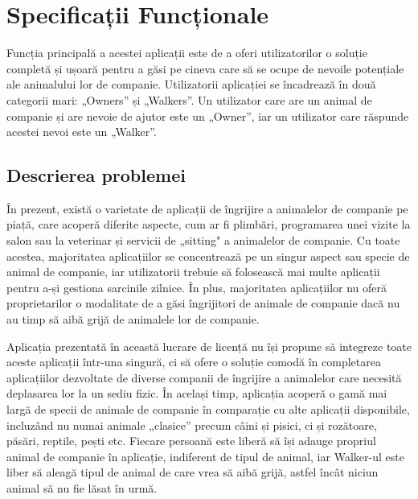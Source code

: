 \chapter{Specificații Funcționale}

Funcția principală a acestei aplicații este de a oferi utilizatorilor o soluție completă și ușoară pentru a găsi pe cineva care să se ocupe de nevoile potențiale ale animalului lor de companie. Utilizatorii aplicației se încadrează în două categorii mari: „Owners” și „Walkers”. Un utilizator care are un animal de companie și are nevoie de ajutor este un „Owner”, iar un utilizator care răspunde acestei nevoi este un „Walker”.

\section{Descrierea problemei}

În prezent, există o varietate de aplicații de îngrijire a animalelor de companie pe piață, care acoperă diferite aspecte, cum ar fi plimbări, programarea unei vizite la salon sau la veterinar și servicii de „sitting" a animalelor de companie. Cu toate acestea, majoritatea aplicațiilor se concentrează pe un singur aspect sau specie de animal de companie, iar utilizatorii trebuie să folosească mai multe aplicații pentru a-și gestiona sarcinile zilnice. În plus, majoritatea aplicațiilor nu oferă proprietarilor o modalitate de a găsi îngrijitori de animale de companie dacă nu au timp să aibă grijă de animalele lor de companie.

Aplicația prezentată în această lucrare de licență nu își propune să integreze toate aceste aplicații într-una singură, ci să ofere o soluție comodă în completarea aplicațiilor dezvoltate de diverse companii de îngrijire a animalelor care necesită deplasarea lor la un sediu fizic. În același timp, aplicația acoperă o gamă mai largă de specii de animale de companie în comparație cu alte aplicații disponibile, incluzând nu numai animale „clasice” precum câini și pisici, ci și rozătoare, păsări, reptile, pești etc. Fiecare persoană este liberă să își adauge propriul animal de companie în aplicație, indiferent de tipul de animal, iar Walker-ul este liber să aleagă tipul de animal de care vrea să aibă grijă, astfel încât niciun animal să nu fie lăsat în urmă.


